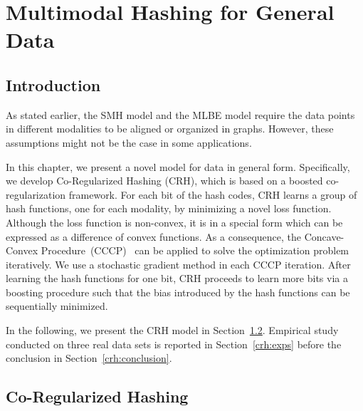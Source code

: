 
\chapter{Multimodal Hashing for General Data}
\label{chap:crh}

\section{Introduction}

As stated earlier, the \mbox{SMH} model and the \mbox{MLBE} model require the data points in different modalities to be aligned or organized in graphs. However, these assumptions might not be the case in some applications. 

In this chapter, we present a novel model for data in general form. Specifically, we develop Co-Regularized Hashing (\mbox{CRH}), which is based on a boosted co-regularization framework. For each bit of the hash codes, \mbox{CRH} learns a group of hash functions, one for each modality, by minimizing a novel loss function. Although the loss function is non-convex, it is in a special form which can be expressed as a difference of convex functions.  As a consequence, the Concave-Convex Procedure~(CCCP)~\cite{yuille2001nips}
can be applied to solve the optimization problem iteratively.  We use a stochastic gradient method in each \mbox{CCCP} iteration. After learning the hash functions for one bit, \mbox{CRH} proceeds to learn more bits via a boosting procedure such that the bias introduced by the hash functions can be sequentially minimized.

In the following, we present the \mbox{CRH} model in Section~\ref{crh:model}. Empirical study conducted on three real data sets is reported in Section~\ref{crh:exps} before the conclusion in Section~\ref{crh:conclusion}.

\section{Co-Regularized Hashing}
\label{crh:model}



